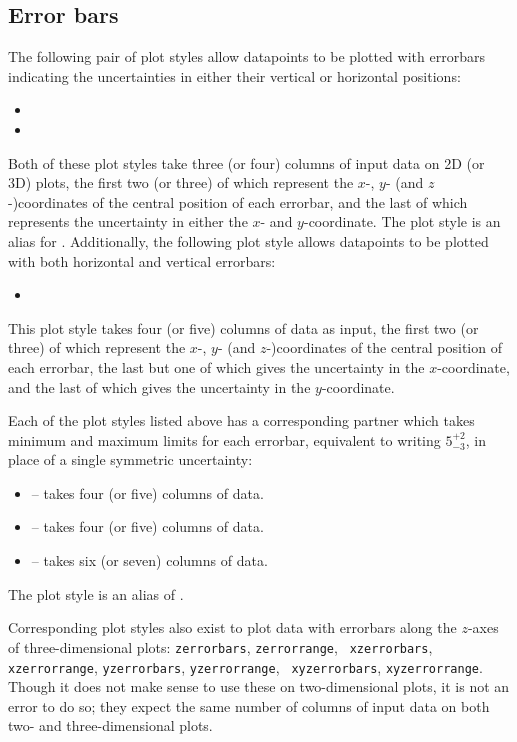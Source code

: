 \subsection{Error bars}
\label{sec:errorbars}

The following pair of plot styles allow datapoints to be plotted with errorbars
indicating the uncertainties in either their vertical or horizontal positions:
\begin{itemize}
\item {}
\item {}
\end{itemize}
Both of these plot styles take three (or four) columns of input data on 2D (or
3D) plots, the first two (or three) of which represent the $x$-, $y$- (and
$z$-)coordinates of the central position of each errorbar, and the last of
which represents the uncertainty in either the $x$- and $y$-coordinate. The
plot style  is an alias for .
Additionally, the following plot style allows datapoints to be plotted with
both horizontal and vertical errorbars:
\begin{itemize}
\item {}
\end{itemize}
This plot style takes four (or five) columns of data as input, the first two
(or three) of which represent the $x$-, $y$- (and $z$-)coordinates of the
central position of each errorbar, the last but one of which gives the
uncertainty in the $x$-coordinate, and the last of which gives the uncertainty
in the $y$-coordinate.

Each of the plot styles listed above has a corresponding partner which takes
minimum and maximum limits for each errorbar, equivalent to writing
$5^{+2}_{-3}$, in place of a single symmetric uncertainty:
\begin{itemize}
\item {} -- takes four (or five) columns of data.
\item {} -- takes four (or five) columns of data.
\item {} -- takes six (or seven) columns of data.
\end{itemize}
The plot style  is an alias of .

Corresponding plot styles also exist to plot data with errorbars along the
$z$-axes of three-dimensional plots: {\tt zerrorbars}, {\tt zerrorrange}, {\tt
xzerrorbars}, {\tt xzerrorrange}, {\tt yzerrorbars}, {\tt yzerrorrange}, {\tt
xyzerrorbars}, {\tt xyzerrorrange}. Though it does not make sense to use these
on two-dimensional plots, it is not an error to do so; they expect the same
number of columns of input data on both two- and three-dimensional plots.

